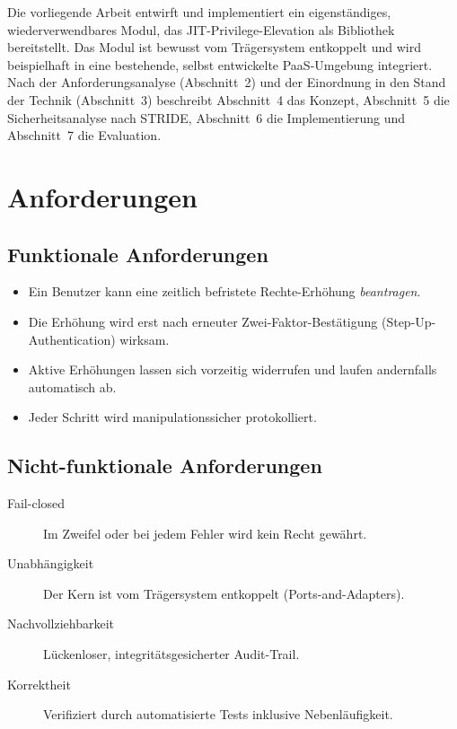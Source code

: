 \documentclass[11pt,a4paper]{article}
\begin{document}
Die vorliegende Arbeit entwirft und implementiert ein eigenständiges,
wiederverwendbares Modul, das JIT-Privilege-Elevation als Bibliothek
bereitstellt. Das Modul ist bewusst vom Trägersystem entkoppelt und wird
beispielhaft in eine bestehende, selbst entwickelte PaaS-Umgebung integriert.
Nach der Anforderungsanalyse (Abschnitt~2) und der Einordnung in den Stand der
Technik (Abschnitt~3) beschreibt Abschnitt~4 das Konzept, Abschnitt~5 die
Sicherheitsanalyse nach STRIDE, Abschnitt~6 die Implementierung und
Abschnitt~7 die Evaluation.

\section{Anforderungen}

\subsection{Funktionale Anforderungen}
\begin{itemize}
  \item Ein Benutzer kann eine zeitlich befristete Rechte-Erhöhung
        \emph{beantragen}.
  \item Die Erhöhung wird erst nach erneuter Zwei-Faktor-Bestätigung
        (Step-Up-Authentication) wirksam.
  \item Aktive Erhöhungen lassen sich vorzeitig widerrufen und laufen
        andernfalls automatisch ab.
  \item Jeder Schritt wird manipulationssicher protokolliert.
\end{itemize}

\subsection{Nicht-funktionale Anforderungen}
\begin{description}
  \item[Fail-closed] Im Zweifel oder bei jedem Fehler wird kein Recht gewährt.
  \item[Unabhängigkeit] Der Kern ist vom Trägersystem entkoppelt
        (Ports-and-Adapters).
  \item[Nachvollziehbarkeit] Lückenloser, integritätsgesicherter Audit-Trail.
  \item[Korrektheit] Verifiziert durch automatisierte Tests inklusive
        Nebenläufigkeit.
\end{description}
\end{document}
